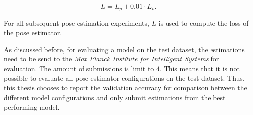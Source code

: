 \begin{equation}
    L = L_p + 0.01 \cdot L_v.
\end{equation}

For all subsequent pose estimation experiments, $L$ is used to compute the loss of the pose estimator.

As discussed before, for evaluating a model on the test dataset, the estimations need to be send to the \textit{Max Planck Institute for Intelligent Systems} for evaluation.
The amount of submissions is limit to $4$.
This means that it is not possible to evaluate all pose estimator configurations on the test dataset.
Thus, this thesis chooses to report the validation accuracy for comparison between the different model configurations and only submit estimations from the best performing model.

    


